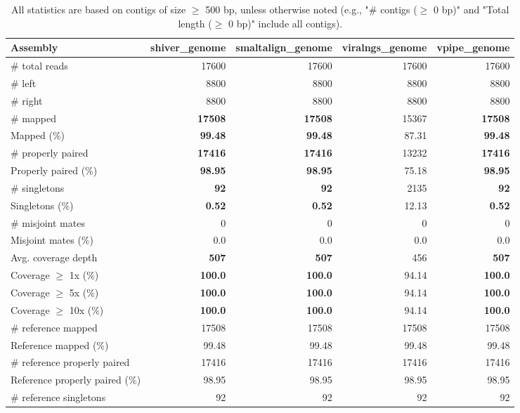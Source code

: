 \documentclass[12pt,a4paper]{article}
\begin{document}
\begin{table}[ht]
\begin{center}
\caption{All statistics are based on contigs of size $\geq$ 500 bp, unless otherwise noted (e.g., "\# contigs ($\geq$ 0 bp)" and "Total length ($\geq$ 0 bp)" include all contigs).}
\begin{tabular}{|l*{4}{|r}|}
\hline
Assembly & shiver\_genome & smaltalign\_genome & viralngs\_genome & vpipe\_genome \\ \hline
\# total reads & 17600 & 17600 & 17600 & 17600 \\ \hline
\# left & 8800 & 8800 & 8800 & 8800 \\ \hline
\# right & 8800 & 8800 & 8800 & 8800 \\ \hline
\# mapped & {\bf 17508} & {\bf 17508} & 15367 & {\bf 17508} \\ \hline
Mapped (\%) & {\bf 99.48} & {\bf 99.48} & 87.31 & {\bf 99.48} \\ \hline
\# properly paired & {\bf 17416} & {\bf 17416} & 13232 & {\bf 17416} \\ \hline
Properly paired (\%) & {\bf 98.95} & {\bf 98.95} & 75.18 & {\bf 98.95} \\ \hline
\# singletons & {\bf 92} & {\bf 92} & 2135 & {\bf 92} \\ \hline
Singletons (\%) & {\bf 0.52} & {\bf 0.52} & 12.13 & {\bf 0.52} \\ \hline
\# misjoint mates & 0 & 0 & 0 & 0 \\ \hline
Misjoint mates (\%) & 0.0 & 0.0 & 0.0 & 0.0 \\ \hline
Avg. coverage depth & {\bf 507} & {\bf 507} & 456 & {\bf 507} \\ \hline
Coverage $\geq$ 1x (\%) & {\bf 100.0} & {\bf 100.0} & 94.14 & {\bf 100.0} \\ \hline
Coverage $\geq$ 5x (\%) & {\bf 100.0} & {\bf 100.0} & 94.14 & {\bf 100.0} \\ \hline
Coverage $\geq$ 10x (\%) & {\bf 100.0} & {\bf 100.0} & 94.14 & {\bf 100.0} \\ \hline
\# reference mapped & 17508 & 17508 & 17508 & 17508 \\ \hline
Reference mapped (\%) & 99.48 & 99.48 & 99.48 & 99.48 \\ \hline
\# reference properly paired & 17416 & 17416 & 17416 & 17416 \\ \hline
Reference properly paired (\%) & 98.95 & 98.95 & 98.95 & 98.95 \\ \hline
\# reference singletons & 92 & 92 & 92 & 92 \\ \hline

\end{tabular}
\end{center}
\end{table}
\end{document}
